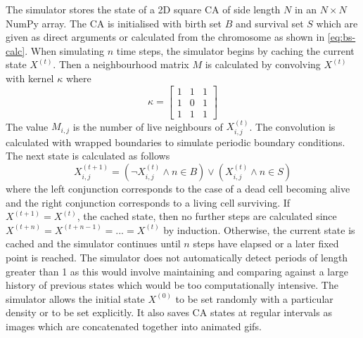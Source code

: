 The simulator stores the state of a 2D square CA of side length $N$ in an $N \times N$ NumPy array. The CA is initialised with birth set $B$ and survival set $S$ which are given as direct arguments or calculated from the chromosome as shown in \ref{eq:bs-calc}. When simulating $n$ time steps, the simulator begins by caching the current state $X^{(t)}$. Then a neighbourhood matrix $M$ is calculated by convolving $X^{(t)}$ with kernel $\kappa$ where
\[
    \kappa = \begin{bmatrix}
        1 & 1 & 1\\
        1 & 0 & 1\\
        1 & 1 & 1
        \end{bmatrix}    
\]
The value $M_{i,j}$ is the number of live neighbours of $X^{(t)}_{i,j}$. The convolution is calculated with wrapped boundaries to simulate periodic boundary conditions. The next state is calculated as follows
\[
    X^{(t+1)}_{i,j}= (\lnot X^{(t)}_{i,j} \land n \in B) \lor (X^{(t)}_{i,j} \land n \in S)
\]
where the left conjunction corresponds to the case of a dead cell becoming alive and the right conjunction corresponds to a living cell surviving. If $X^{(t+1)} = X^{(t)}$, the cached state, then no further steps are calculated since $X^{(t + n)} = X^{(t + n - 1)} = ... = X^{(t)}$ by induction. Otherwise, the current state is cached and the simulator continues until $n$ steps have elapsed or a later fixed point is reached. The simulator does not automatically detect periods of length greater than 1 as this would involve maintaining and comparing against a large history of previous states which would be too computationally intensive. The simulator allows the initial state $X^{(0)}$ to be set randomly with a particular density or to be set explicitly. It also saves CA states at regular intervals as images which are concatenated together into animated gifs.\\

